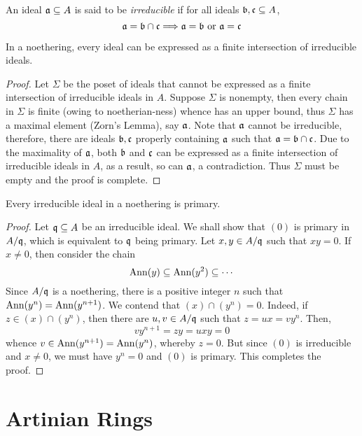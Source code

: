 \begin{definition}[Irreducible]
    An ideal $\mathfrak a\subseteq A$ is said to be \textit{irreducible} if for all ideals $\mathfrak b,\mathfrak c\subseteq A$,
    \begin{equation*}
        \mathfrak a = \mathfrak b\cap\mathfrak c\Longrightarrow \mathfrak a = \mathfrak b\text{ or }\mathfrak a = \mathfrak c
    \end{equation*}
\end{definition}

\begin{lemma}
    In a noethering, every ideal can be expressed as a finite intersection of irreducible ideals.
\end{lemma}
\begin{proof}
    Let $\Sigma$ be the poset of ideals that cannot be expressed as a finite intersection of irreducible ideals in $A$. Suppose $\Sigma$ is nonempty, then every chain in $\Sigma$ is finite (owing to noetherian-ness) whence has an upper bound, thus $\Sigma$ has a maximal element (Zorn's Lemma), say $\mathfrak a$. Note that $\mathfrak a$ cannot be irreducible, therefore, there are ideals $\mathfrak b,\mathfrak c$ properly containing $\mathfrak a$ such that $\mathfrak a = \mathfrak b\cap\mathfrak c$. Due to the maximality of $\mathfrak a$, both $\mathfrak b$ and $\mathfrak c$ can be expressed as a finite intersection of irreducible ideals in $A$, as a result, so can $\mathfrak a$, a contradiction. Thus $\Sigma$ must be empty and the proof is complete.
\end{proof}

\begin{lemma}
    Every irreducible ideal in a noethering is primary.
\end{lemma}
\begin{proof}
    Let $\mathfrak q\subseteq A$ be an irreducible ideal. We shall show that $(0)$ is primary in $A/\mathfrak q$, which is equivalent to $\mathfrak q$ being primary. Let $x,y\in A/\mathfrak q$ such that $xy = 0$. If $x\ne 0$, then consider the chain 
    \begin{equation*}
        \operatorname{Ann}(y)\subseteq\operatorname{Ann}(y^2)\subseteq\cdots
    \end{equation*}
    Since $A/\mathfrak q$ is a noethering, there is a positive integer $n$ such that $\operatorname{Ann}(y^n) = \operatorname{Ann}(y^{n + 1})$. We contend that $(x)\cap(y^n) = 0$. Indeed, if $z\in(x)\cap(y^n)$, then there are $u,v\in A/\mathfrak q$ such that $z = ux = vy^n$. Then,
    \begin{equation*}
        vy^{n + 1} = zy = uxy = 0
    \end{equation*}
    whence $v\in\operatorname{Ann}(y^{n + 1}) = \operatorname{Ann}(y^n)$, whereby $z = 0$. But since $(0)$ is irreducible and $x\ne 0$, we must have $y^n = 0$ and $(0)$ is primary. This completes the proof.
\end{proof}

\section{Artinian Rings}

